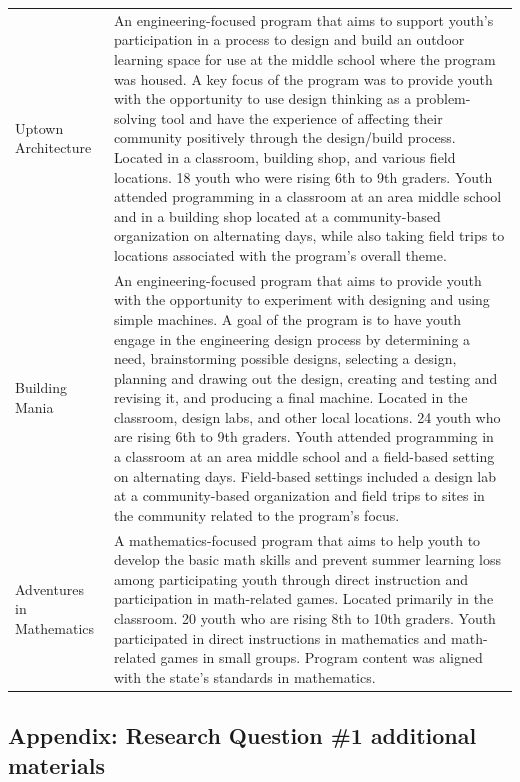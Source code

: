 \documentclass[]{book}
\theoremstyle{definition}
\theoremstyle{definition}
\theoremstyle{definition}
\theoremstyle{remark}
\begin{document}
\begin{landscape}
\begin{table}
\begin{tabular}[t]{ll}
Uptown Architecture & An engineering-focused program that aims to support youth's participation in a process to design and build an outdoor learning space for use at the middle school where the program was housed. A key focus of the program was to provide youth with the opportunity to use design thinking as a problem-solving tool and have the experience of affecting their community positively through the design/build process. Located in a classroom, building shop, and various field locations. 18 youth who were rising 6th to 9th graders. Youth attended programming in a classroom at an area middle school and in a building shop located at a community-based organization on alternating days, while also taking field trips to locations associated with the program's overall theme.\\
Building Mania & An engineering-focused program that aims to provide youth with the opportunity to experiment with designing and using simple machines. A goal of the program is to have youth engage in the engineering design process by determining a need, brainstorming possible designs, selecting a design, planning and drawing out the design, creating and testing and revising it, and producing a final machine. Located in the classroom, design labs, and other local locations. 24 youth who are rising 6th to 9th graders. Youth attended programming in a classroom at an area middle school and a field-based setting on alternating days. Field-based settings included a design lab at a community-based organization and field trips to sites in the community related to the program's focus.\\
Adventures in Mathematics & A mathematics-focused program that aims to help youth to develop the basic math skills and prevent summer learning loss among participating youth through direct instruction and participation in math-related games. Located primarily in the classroom. 20 youth who are rising 8th to 10th graders. Youth participated in direct instructions in mathematics and math-related games in small groups. Program content was aligned with the state's standards in mathematics.\\
\bottomrule
\end{tabular}
\end{table}
\end{landscape}

\subsection{Appendix: Research Question \#1 additional
materials}\label{appendix-research-question-1-additional-materials}
\end{document}
